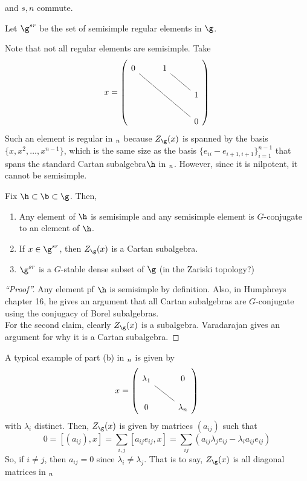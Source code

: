  and \(s,n\) commute.
 \begin{defn}
   Let \(\g^{sr}\) be the set of semisimple regular elements in
   \(\g\). 
 \end{defn}
 \begin{example}
   Note that not all regular elements are semisimple. Take \[
     x = \left(
       \begin{tikzcd}
         0 \ar[rrdd, dash]& 1 \ar[rd, dash] & \\
         & & 1 \\
         & & 0
       \end{tikzcd}
     \right)
   \]
   Such an element is regular in \(\sl_n\) because \(Z_\g(x)\) is
   spanned by the basis \(\{x, x^2, \ldots, x^{n-1}\}\), which is the
   same size as the basis \(\{e_{ii} - e_{i+1,i+1}\}_{i=1}^{n-1}\)
   that spans the standard Cartan subalgebra\(\h\) in
   \(\sl_n\). However, since it is nilpotent, it cannot be semisimple.
 \end{example}
 \begin{prop}
   Fix \(\h \subset \b \subset \g\). Then,
   \begin{enumerate}
   \item Any element of \(\h\) is semisimple and any semisimple
     element is \(G\)-conjugate to an element of \(\h\).
   \item If \(x \in \g^{sr}\), then \(Z_\g(x)\) is a Cartan
     subalgebra.
   \item \(\g^{sr}\) is a \(G\)-stable dense subset of \(\g\) (in the
     Zariski topology?)
   \end{enumerate}
 \end{prop}
 \begin{proof}[``Proof'']
   Any element pf \(\h\) is semisimple by definition. Also, in
   Humphreys chapter 16, he gives an argument that all Cartan subalgebras
   are \(G\)-conjugate using the conjugacy of Borel subalgebras. \\

   For the second claim, clearly \(Z_\g(x)\) is a
   subalgebra. Varadarajan gives an argument for why it is a Cartan
   subalgebra. 
 \end{proof}
 \begin{example}
   A typical example of part (b) in \(\sl_n\) is given by \[
     x = \left(
       \begin{tikzcd}
         \lambda_1 \ar[rd, dash]& 0 \\
         0 & \lambda_n
       \end{tikzcd}
     \right)
   \]
   with \(\lambda_i\) distinct. Then, \(Z_\g(x)\) is given by matrices
   \((a_{ij})\) such that \[
     0 = [(a_{ij}), x] = \sum_{i,j} [a_{ij} e_{ij}, x] = \sum_{ij}
     (a_{ij} \lambda_j e_{ij} - \lambda_i a_{ij} e_{ij})
   \]
   So, if \(i \neq j\), then \(a_{ij} = 0\) since \(\lambda_i \neq
   \lambda_j\). That is to say, \(Z_\g(x)\) is all diagonal matrices
   in \(\sl_n\)
 \end{example}
